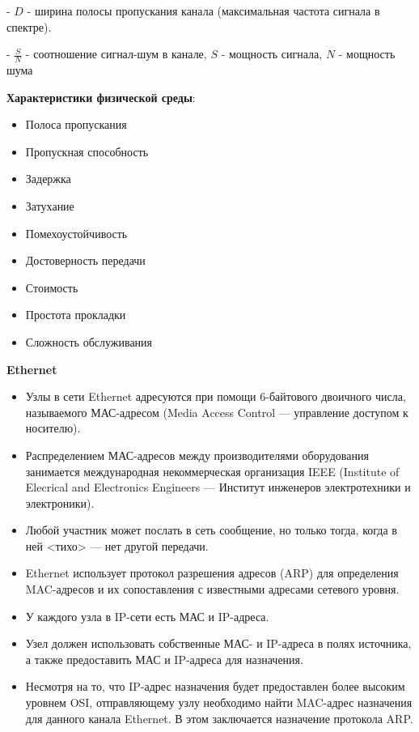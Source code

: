 - $D$ - ширина полосы пропускания канала (максимальная частота сигнала в спектре).

- $\frac{S}{N}$ - соотношение сигнал-шум в канале,  $S$ - мощность сигнала, $N$ - мощность шума

\textbf{Характеристики физической среды}:
\begin{itemize}
    \item Полоса пропускания
    \item Пропускная способность
    \item Задержка
    \item Затухание
    \item Помехоустойчивость
    \item Достоверность передачи
    \item Стоимость
    \item Простота прокладки
    \item Сложность обслуживания
\end{itemize}


\textbf{\textbf{Ethernet}}

\begin{itemize}
    \item Узлы в сети Ethernet адресуются при помощи 6-байтового двоичного числа, называемого МАС-адресом (Media Access Control — управление доступом к носителю).
    \item Распределением МАС-адресов между производителями оборудования занимается международная некоммерческая организация IEEE (Institute of Elecrical and Electronics Engineers — Институт инженеров электротехники и электроники).
    \item Любой участник может послать в сеть сообщение, но только тогда, когда в ней <тихо> --- нет другой передачи.
    \item Ethernet использует протокол разрешения адресов (ARP) для определения MAC-адресов и их сопоставления с известными адресами сетевого уровня.
    \item У каждого узла в IP-сети есть МАС и IP-адреса.
    \item Узел должен использовать собственные МАС- и IP-адреса в полях источника, а также предоставить МАС и IP-адреса для назначения.
   \item  Несмотря на то, что IP-адрес назначения будет предоставлен более высоким уровнем OSI, отправляющему узлу необходимо найти MAC-адрес назначения для данного канала Ethernet.
    В этом заключается назначение протокола ARP.
\end{itemize}

